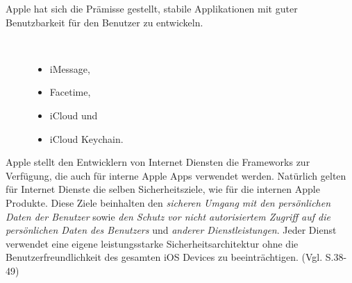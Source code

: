 Apple hat sich die Prämisse gestellt, stabile Applikationen mit guter Benutzbarkeit für den Benutzer zu entwickeln. 
\begin{description}
    \item[\parbox{\textwidth} {Beispiele für solche internen iOS Apps sind }]~\par
    \begin{itemize}
       \item iMessage,
       \item Facetime,
       \item iCloud und 
       \item iCloud Keychain.
    \end{itemize}
\end{description} 

Apple stellt den Entwicklern von Internet Diensten die Frameworks zur Verfügung, die auch für interne Apple Apps verwendet werden. Natürlich gelten für Internet Dienste die selben Sicherheitsziele, wie für die internen Apple Produkte. Diese Ziele beinhalten den \textit{\glqq sicheren Umgang mit den persönlichen Daten der Benutzer\grqq{}} sowie \textit{\glqq den Schutz vor nicht autorisiertem Zugriff auf die persönlichen Daten des Benutzers\grqq{}} und \textit{\glqq anderer Dienstleistungen\grqq{}}. Jeder Dienst verwendet eine eigene leistungsstarke Sicherheitsarchitektur ohne die Benutzerfreundlichkeit des gesamten iOS Devices zu beeinträchtigen. (Vgl. \cite{Apple[4]} S.38-49)

